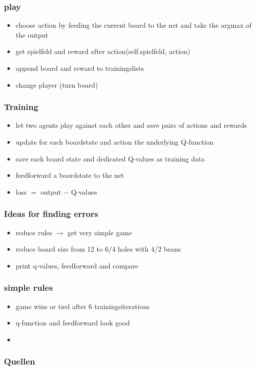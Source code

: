\documentclass{beamer}
\begin{document}
 \begin{frame}
 \frametitle{play}
 \begin{itemize}
\item choose action by feeding the current board to the net and take the argmax of the output
\item get spielfeld and reward after action(self.spielfeld, action)
\item append board and reward to trainingslists
\item change player (turn board)
\end{itemize}
 \end{frame}
 
 
 \begin{frame}
 \frametitle{Training}
 \begin{itemize}
\item let two agents play against each other and save pairs of actions and rewards
\item update for each boardstate and action the underlying Q-function
\item save each board state and dedicated Q-values as training data
\item feedforward a boardstate to the net
\item loss $=$ output $-$ Q-values
\end{itemize}
 \end{frame}
 
\begin{frame}
\frametitle{Ideas for finding errors}
\begin{itemize}
\item reduce rules $\rightarrow$ get very simple game
\item reduce board size from 12 to 6/4 holes with 4/2 beans
\item print q-values, feedforward and compare
\end{itemize}
\end{frame}

\begin{frame}
\frametitle{simple rules}
\begin{itemize}
\item game wins or tied after $6$ trainingsiterations
\item q-function and feedforward look good
\end{itemize}
\end{frame}


\begin{frame}
\begin{itemize}
\frametitle{simple board}
\item
\end{itemize}
\end{frame}

\begin{frame}
\frametitle{Quellen}
\end{frame}
\end{document}
